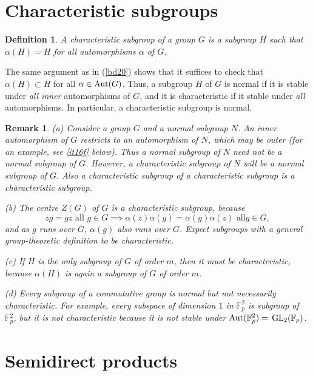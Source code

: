 \documentclass[a4paper,11pt,final]{memoir}%
\newtheorem{definition}[X]{Definition}
\newtheorem{remark}[X]{Remark}
\theoremstyle{nonumberplain}
\begin{document}
\section{Characteristic subgroups}

\begin{definition}
\label{it11} A \emph{characteristic subgroup}%
of a group $G$ is a subgroup $H$ such that $\alpha(H)=H$ for all automorphisms
$\alpha$ of $G$.
\end{definition}

The same argument as in (\ref{bd20}) shows that it suffices to check that
$\alpha(H)\subset H$ for all $\alpha\in\operatorname{Aut}(G)$. Thus, a subgroup $H$ of $G$
is normal if it is stable under \textit{all inner} automorphisms of $G$, and
it is characteristic if it stable under \textit{all} automorphisms. In
particular, a characteristic subgroup is normal.

\begin{remark}
\label{it12} (a) Consider a group $G$ and a normal subgroup $N$. An inner
automorphism of $G$ restricts to an automorphism of $N$, which may be outer
(for an example, see \ref{it16f} below). Thus a normal subgroup of $N$ need
not be a normal subgroup of $G$. However, a characteristic subgroup of $N$
will be a normal subgroup of $G$. Also a characteristic subgroup of a
characteristic subgroup is a characteristic subgroup.

(b) The centre $Z(G)$ of $G$ is a characteristic subgroup, because
\[
zg=gz\text{ all }g\in G\implies\alpha(z)\alpha(g)=\alpha(g)\alpha(z)\text{ all
}g\in G,
\]
and as $g$ runs over $G$, $\alpha(g)$ also runs over $G$. Expect subgroups
with a general group-theoretic definition to be characteristic.

(c) If $H$ is the only subgroup of $G$ of order $m$, then it must be
characteristic, because $\alpha(H)$ is again a subgroup of $G$ of order $m$.

(d) Every subgroup of a commutative group is normal but not necessarily
characteristic. For example, every subspace of dimension $1$ in $\mathbb{F}%
_{p}^{2}$ is subgroup of $\mathbb{F}{}_{p}^{2}$, but it is not characteristic
because it is not stable under $\operatorname{Aut}(\mathbb{F}{}_{p}^{2})=$ $\GL_{2}%
(\mathbb{F}_{p})$.
\end{remark}

\section{Semidirect products}
\end{document}

